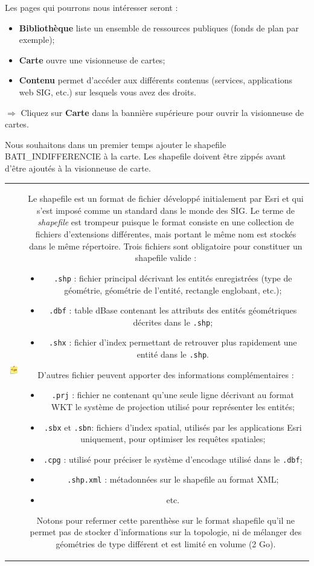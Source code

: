 \documentclass[11pt]{article}
\newcommand{\action}{$\Rightarrow$ }
\newenvironment{note}{%
	\begin{tabular}[t t]{c c}
		\includegraphics{img/tips.png}
		 &
		\begin{minipage}[c]{0.9\linewidth}
			\begin{sffamily}
}{%
			\end{sffamily}
		\end{minipage}
	\end{tabular}
}
\newcommand{\code}[1]{\lstinline{#1}}
\begin{document}
Les pages qui pourrons nous intéresser seront :
\begin{itemize}
	\item \textbf{Bibliothèque} liste un ensemble de ressources publiques (fonds de plan par exemple);
	\item \textbf{Carte} ouvre une visionneuse de cartes;
	\item \textbf{Contenu} permet d'accéder aux différents contenus (services, applications web SIG, etc.) sur lesquels vous avez des droits.
\end{itemize}

\vspace{1em}

\action Cliquez sur \textbf{Carte} dans la bannière supérieure pour ouvrir la visionneuse de cartes.

Nous souhaitons dans un premier temps ajouter le shapefile BATI\_INDIFFERENCIE à la carte. Les shapefile doivent être zippés avant d'être ajoutés à la visionneuse de carte.

\begin{note}
Le shapefile est un format de fichier développé initialement par Esri et qui s'est imposé comme un standard dans le monde des SIG. Le terme de \textit{shapefile} est trompeur puisque le format consiste en une collection de fichiers d'extensions différentes, mais portant le même nom est stockés dans le même répertoire. Trois fichiers sont obligatoire pour constituer un shapefile valide :
\begin{itemize}
	\item \code{.shp} : fichier principal décrivant les entités enregistrées (type de géométrie, géométrie de l'entité, rectangle englobant, etc.);
	\item \code{.dbf} : table dBase contenant les attributs des entités géométriques décrites dans le \code{.shp};
	\item \code{.shx} : fichier d'index permettant de retrouver plus rapidement une entité dans le \code{.shp}.
\end{itemize}
D'autres fichier peuvent apporter des informations complémentaires :
\begin{itemize}
	\item \code{.prj} : fichier ne contenant qu'une seule ligne décrivant au format WKT le système de projection utilisé pour représenter les entités;
	\item \code{.sbx} et \code{.sbn}: fichiers d'index spatial, utilisés par les applications Esri uniquement, pour optimiser les requêtes spatiales;
	\item \code{.cpg} : utilisé pour préciser le système d'encodage utilisé dans le \code{.dbf};
	\item \code{.shp.xml} : métadonnées sur le shapefile au format XML;
	\item etc.
\end{itemize}
Notons pour refermer cette parenthèse sur le format shapefile qu'il ne permet pas de stocker d'informations sur la topologie, ni de mélanger des géométries de type différent et est limité en volume (2 Go).
\end{note}
\end{document}
